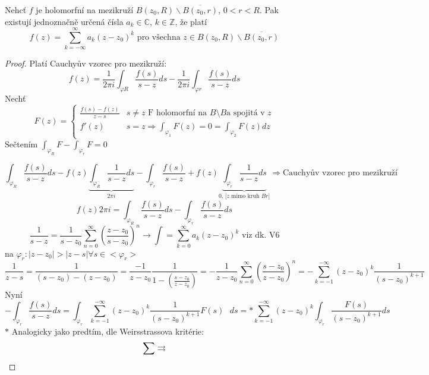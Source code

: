 \begin{vetat}
Nehcť $f$ je holomorfní na mezikruží $B(z_0, R) \backslash \overline{B(z_0, r)}$, $0 < r < R$. Pak existují jednoznačně určená čísla $a_k \in \mathbb{C}$, $k \in \mathbb{Z}$, že platí 
$$f(z) = \sum_{k= - \infty}^\infty a_k (z-z_0)^k \textrm{ pro všechna } z \in B(z_0, R) \backslash \overline{B(z_0, r)}$$
\end{vetat}
\begin{proof}
Platí Cauchyův vzorec pro mezikruží:
$$f(z) = \frac{1}{2\pi i}\int_{\varphi R}\frac{f(s)}{s-z}ds - \frac{1}{2\pi i} \int_{\varphi r} \frac{f(s)}{s-z}ds$$
Nechť
\begin{equation}
F(z) = \left\{ \begin{array}{ll}
 \frac{f(s) - f(z)}{z-s}  & s \neq z \textrm{ F holomorfní na } B \setminus B \textrm{a spojitá v } z \nonumber\\
 f'(z) & s=z \Rightarrow \int_{\varphi_1} F(z) = 0 = \int_{\varphi_2}F(z) dz
  \end{array} \right.
\end{equation}
Sečtením $\int_{\varphi_R}F - \int_{\varphi_r} F = 0 $

$$\int_{\varphi_R} \frac{f(s)}{s-z} ds - f(z) \underbrace{\int_{\varphi_R} \frac{1}{s-z} ds}_{2\pi i}  - \int_{\varphi_r} \frac{f(s)}{s-z} + f(z) \underbrace{\int_{\varphi_r} \frac{1}{s-z} ds}_{0\textrm{, [$z$ mimo kruh $Br$]}} \Rightarrow \textrm{Cauchyův vzorec pro mezikruží}$$
$$f(z)2\pi i = \int_{\varphi_R}  \frac{f(s)}{s-z} ds - \int_{\varphi_r} \frac{f(s)}{s-z} ds $$
$$\frac{1}{s-z} = \frac{1}{s- z_0} \sum_{n=0}^\infty \left( \frac{z-z_0}{s-z_0} \right)^n \rightarrow \int = \sum_{k=0}^\infty a_k (z-z_0)^k \textrm{ viz dk. V6}$$
na $ \varphi_r : |z-z_0| > |z-s| \forall s \in <\varphi_r>$
$$\frac{1}{z-s} = \frac{1}{(s-z_0)-(z-z_0)} = \frac{-1}{z-z_0} \frac{1}{1-\left(\frac{s-z_0}{z-z_0}\right)} = - \frac{1}{z-z_0} \sum_{n =0}^\infty {\left(\frac{s-z_0}{z-z_0}\right)}^n = -\sum_{k= -1}^{-\infty} (z-z_0)^k \frac{1}{(s-z_0)^{k+1}} $$
Nyní 
$$-\int_{\varphi_r} \frac{f(s)}{s-z}ds = \int_{\varphi_r} \sum_{k=-1}^{-\infty} (z-z_0)^k \frac{1}{(s-z_0)^{k+1}}F(s)\textrm{ } ds = \ast \sum_{k=-1}^{-\infty} (z-z_0)^k \int_{\varphi_r} \frac{F(s)}{(s-z_0)^{k+1}}ds  $$
$\ast$ Analogicky jako predtím, dle Weirsstrassova kritérie:
$$\sum \rightrightarrows$$
\end{proof}
